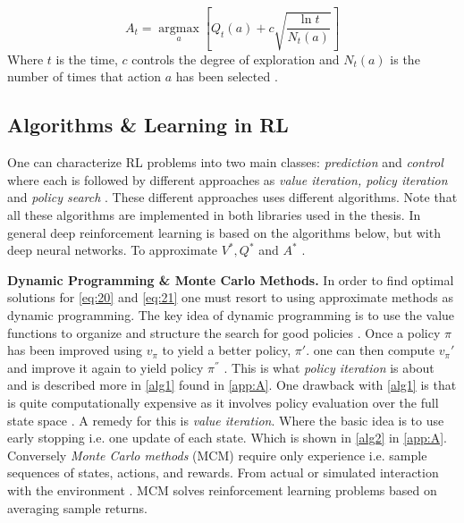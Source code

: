 \documentclass{kththesis}
\theoremstyle{definition}
\begin{document}
\begin{equation}
    \label{eq:21c}
    A_t = \underset{a}{\operatorname{argmax}} \left[Q_t(a) + c \sqrt{\frac{\ln{t}}{N_t(a)}} \right]
\end{equation}
Where $t$ is the time, $c$ controls the degree of exploration and $N_t(a)$ is the number of times that action $a$ has been selected \parencite{sutton1998reinforcement}.

\newpage

\subsection{Algorithms \& Learning in RL}
One can characterize RL problems into two main classes: \textit{prediction} and \textit{control} where each is followed by different approaches as \textit{value iteration, policy iteration} and \textit{policy search} \parencite{szepesvari2009algorithms}. These different approaches uses different algorithms. Note that all these algorithms are implemented in both \parencite{plappert2016kerasrl, baselines, schaarschmidt2017tensorforce} libraries used in the thesis. In general deep reinforcement learning is based on the algorithms below, but with deep neural networks. To approximate $V^{*}, Q^{*}$ and $A^{*}$ \parencite{arulkumaran2017brief}. 
\newline

\textbf{Dynamic Programming \& Monte Carlo Methods.} In order to find optimal solutions for \autoref{eq:20} and \autoref{eq:21} one must resort to using approximate methods as dynamic programming. The key idea of dynamic programming is to use the value functions to organize and structure the search for good policies \parencite{sutton1998reinforcement, szepesvari2009algorithms}. Once a policy $\pi$ has been improved using $v_{\pi}$ to yield a better policy,  $\pi'$. one can then compute $v_{\pi}'$ and improve it again to yield policy $\pi^{''}$ \parencite{sutton1998reinforcement}. This is what \textit{policy iteration} is about and is described more in \autoref{alg1} found in \autoref{app:A}.
\newline
\newline
One drawback with \autoref{alg1} is that is quite computationally expensive as it involves policy evaluation over the full state space \parencite{sutton1998reinforcement}. A remedy for this is \textit{value iteration}. Where the basic idea is to use early stopping i.e. one update of each state. Which is shown in \autoref{alg2} in \autoref{app:A}. Conversely \textit{Monte Carlo methods} (MCM) require only experience i.e. sample sequences of states, actions, and rewards. From actual or simulated interaction with the environment \parencite{sutton1998reinforcement}. MCM solves reinforcement learning problems based on averaging sample returns. 
\newline
\end{document}
